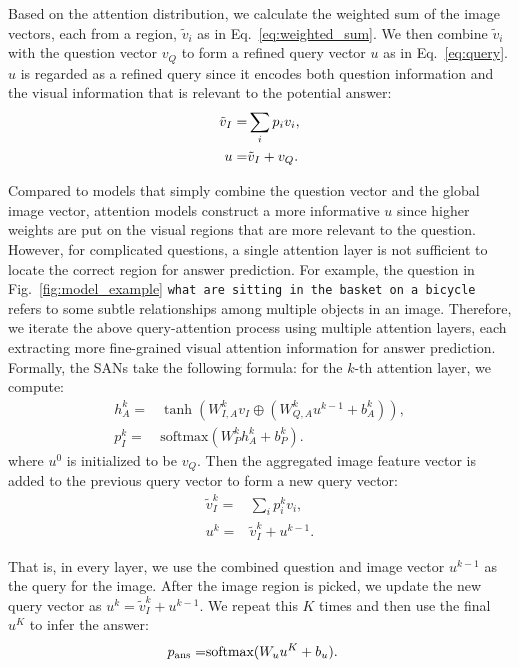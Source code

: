\documentclass[10pt,twocolumn,letterpaper]{article}
\begin{document}
Based on the attention distribution, we calculate the weighted sum of the image
vectors, each from a region, $\tilde{v}_{i}$ as in
Eq.~\ref{eq:weighted_sum}. We then combine $\tilde{v}_{i}$ with the question
vector $v_{Q}$ to form a refined query vector $u$ as in Eq.~\ref{eq:query}. $u$
is regarded as a refined query since it encodes both question information and
the visual information that is relevant to the potential answer:
\begin{align}
  \vspace{-0.5cm}
  \tilde{v}_{I} =& \sum_{i}p_{i}v_{i}, \label{eq:weighted_sum} \\
  u =& \tilde{v}_{I} + v_{Q}. \label{eq:query}
\end{align}

Compared to models that simply combine the question vector and the global image
vector, attention models construct a more informative $u$ since higher weights
are put on the visual regions that are more relevant to the question. However,
for complicated questions, a single attention layer is not sufficient to locate
the correct region for answer prediction. For example, the question in
Fig.~\ref{fig:model_example} \texttt{what are sitting in the basket on a
  bicycle} refers to some subtle relationships among multiple objects in an
image. Therefore, we iterate the above query-attention process using multiple
attention layers, each extracting more fine-grained visual attention
information for answer prediction. Formally, the SANs take the following
formula: for the $k$-th attention layer, we compute:
\begin{align}
  h^{k}_{A} =& \tanh(W_{I, A}^{k}v_{I} \oplus (W_{Q,A}^{k}u^{k-1}  + b_{A}^{k})), \\
  p^k_{I} = &\text{softmax}(W_P^{k}h^{k}_{A} + b_{P}^{k}).
\end{align}
where $u^{0}$ is initialized to be $v_{Q}$. Then the aggregated image feature
vector is added to the previous query vector to form a new query vector:
\begin{align}
  \tilde{v}_{I}^{k} =&\sum_{i} p_{i}^{k} v_{i}, \\
  u^{k} =& \tilde{v}_{I}^{k} + u^{k-1}.
\end{align}

That is, in every layer, we use the combined question and image vector
$u^{k-1}$ as the query for the image. After the image region is picked, we
update the new query vector as $u^{k} = \tilde{v}_{I}^{k} + u^{k-1}$. We repeat
this $K$ times and then use the final $u^{K}$ to infer the answer:
\begin{align}
  \vspace{-0.2cm}
  p_{\text{ans}} =& \text{softmax}(W_{u}u^{K} + b_{u}).
\end{align}
\end{document}
